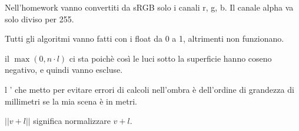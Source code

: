 




Nell'homework vanno convertiti da sRGB solo i canali r, g, b.
Il canale alpha va solo diviso per 255.

Tutti gli algoritmi vanno fatti con i float da 0 a 1, altrimenti non funzionano.


\bigbreak

il $ \max(0, n \cdot l) $ ci sta poichè così le luci sotto la superficie hanno coseno negativo, e quindi vanno escluse.

l ' \epsilon che metto per evitare errori di calcoli nell'ombra è dell'ordine di grandezza di millimetri se la mia scena è in metri.

$ || v + l || $ significa normalizzare $ v + l $.







